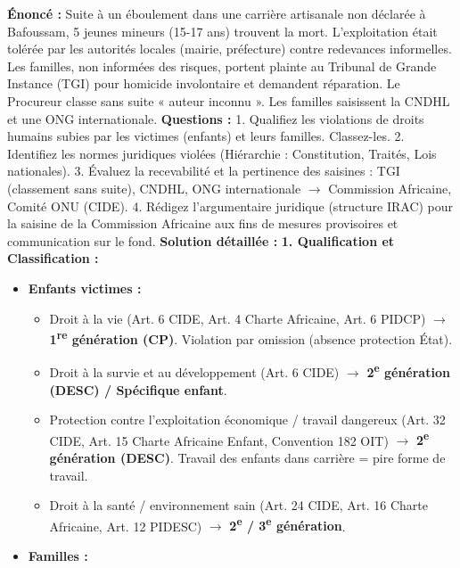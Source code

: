 \documentclass[11pt]{article}
\newcommand{\cle}[1]{{\popxbold\color{popdark}#1}}
\begin{document}
\begin{exoresolu}
    \textbf{Énoncé :} Suite à un éboulement dans une carrière artisanale non déclarée à Bafoussam, 5 jeunes mineurs (15-17 ans) trouvent la mort. L'exploitation était tolérée par les autorités locales (mairie, préfecture) contre redevances informelles. Les familles, non informées des risques, portent plainte au Tribunal de Grande Instance (TGI) pour homicide involontaire et demandent réparation. Le Procureur classe sans suite « auteur inconnu ». Les familles saisissent la CNDHL et une ONG internationale.
    \textbf{Questions :}
    1. Qualifiez les violations de droits humains subies par les victimes (enfants) et leurs familles. Classez-les.
    2. Identifiez les normes juridiques violées (Hiérarchie : Constitution, Traités, Lois nationales).
    3. Évaluez la recevabilité et la pertinence des saisines : TGI (classement sans suite), CNDHL, ONG internationale $\rightarrow$ Commission Africaine, Comité ONU (CIDE).
    4. Rédigez l'argumentaire juridique (structure IRAC) pour la saisine de la Commission Africaine aux fins de mesures provisoires et communication sur le fond.
    \tcblower
    \textbf{Solution détaillée :}
    \textbf{1. Qualification et Classification :}
    \begin{itemize}
        \item \textbf{Enfants victimes :}
            \begin{itemize}
                \item \cle{Droit à la vie (Art. 6 CIDE, Art. 4 Charte Africaine, Art. 6 PIDCP)} $\rightarrow$ \textbf{1\textsuperscript{re} génération (CP)}. Violation par omission (absence protection État).
                \item \cle{Droit à la survie et au développement (Art. 6 CIDE)} $\rightarrow$ \textbf{2\textsuperscript{e} génération (DESC) / Spécifique enfant}.
                \item \cle{Protection contre l'exploitation économique / travail dangereux (Art. 32 CIDE, Art. 15 Charte Africaine Enfant, Convention 182 OIT)} $\rightarrow$ \textbf{2\textsuperscript{e} génération (DESC)}. Travail des enfants dans carrière = pire forme de travail.
                \item \cle{Droit à la santé / environnement sain (Art. 24 CIDE, Art. 16 Charte Africaine, Art. 12 PIDESC)} $\rightarrow$ \textbf{2\textsuperscript{e} / 3\textsuperscript{e} génération}.
            \end{itemize}
        \item \textbf{Familles :}

\end{itemize}
\end{exoresolu}
\end{document}
